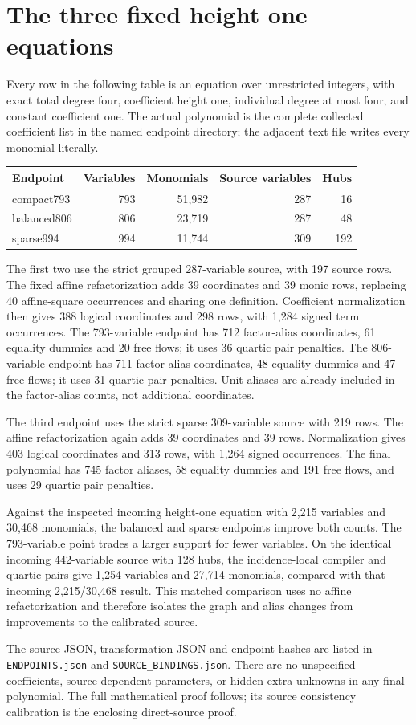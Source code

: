 \section{The three fixed height one equations}
Every row in the following table is an equation over unrestricted integers,
with exact total degree four, coefficient height one, individual degree at
most four, and constant coefficient one. The actual polynomial is the
complete collected coefficient list in the named endpoint directory; the
adjacent text file writes every monomial literally.
\begin{center}
\begin{tabular}{lrrrr}
Endpoint & Variables & Monomials & Source variables & Hubs\\\hline
compact793 & 793 & 51,982 & 287 & 16\\
balanced806 & 806 & 23,719 & 287 & 48\\
sparse994 & 994 & 11,744 & 309 & 192
\end{tabular}
\end{center}
The first two use the strict grouped 287-variable source, with 197 source
rows. The fixed affine refactorization adds 39 coordinates and 39 monic
rows, replacing 40 affine-square occurrences and sharing one definition.
Coefficient normalization then gives 388 logical coordinates and 298
rows, with 1,284 signed term occurrences. The 793-variable endpoint has
712 factor-alias coordinates, 61 equality dummies and 20 free flows; it
uses 36 quartic pair penalties. The 806-variable endpoint has 711
factor-alias coordinates, 48 equality dummies and 47 free flows; it uses
31 quartic pair penalties. Unit aliases are already included in the
factor-alias counts, not additional coordinates.

The third endpoint uses the strict sparse 309-variable source with 219
rows. The affine refactorization again adds 39 coordinates and 39 rows.
Normalization gives 403 logical coordinates and 313 rows, with 1,264
signed occurrences. The final polynomial has 745 factor aliases,
58 equality dummies and 191 free flows, and uses 29 quartic pair penalties.

Against the inspected incoming height-one equation with 2,215 variables
and 30,468 monomials, the balanced and sparse endpoints improve both
counts. The 793-variable point trades a larger support for fewer
variables. On the identical incoming 442-variable source with 128 hubs,
the incidence-local compiler and quartic pairs give 1,254 variables and
27,714 monomials, compared with that incoming 2,215/30,468 result. This
matched comparison uses no affine refactorization and therefore isolates
the graph and alias changes from improvements to the calibrated source.

The source JSON, transformation JSON and endpoint hashes are listed in
\texttt{ENDPOINTS.json} and \texttt{SOURCE\_BINDINGS.json}. There are no
unspecified coefficients, source-dependent parameters, or hidden extra
unknowns in any final polynomial. The full mathematical proof follows;
its source consistency calibration is the enclosing direct-source proof.
